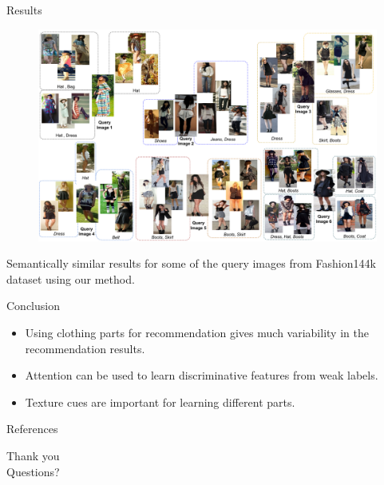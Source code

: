 \documentclass[handout]{beamer}
\begin{document}
\begin{frame}{Results}
\vspace{-1cm}
\begin{center}
  \begin{figure}
    \centering
    \includegraphics[width=0.8\linewidth]{images/staqu_results}
  \end{figure}
\end{center}
Semantically similar results for some of the query images from Fashion144k dataset \cite{SimoSerraCVPR2016} using our method.
\end{frame}

\begin{frame}{Conclusion}
  \begin{itemize}
    \item Using clothing parts for recommendation gives much variability in the recommendation results.
    \item Attention can be used to learn discriminative features from weak labels.
    \item Texture cues are important for learning different parts.
  \end{itemize}
\end{frame}

\begin{frame}{References}
  
    \tiny
\end{frame}

\begin{frame}
\huge{Thank you}\\
\huge{Questions?}\\
\end{frame}
\end{document}
